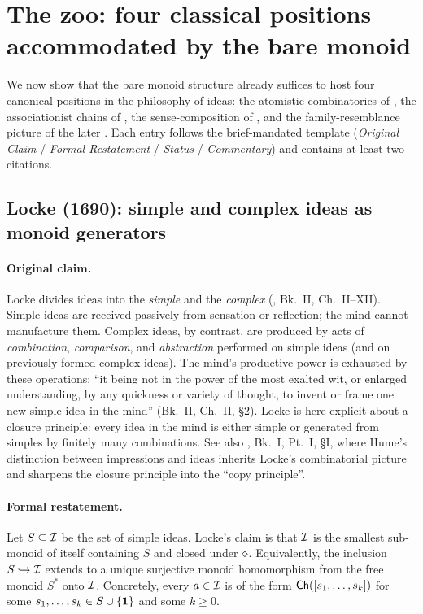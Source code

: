 \section{The zoo: four classical positions accommodated by the bare monoid}\label{sec:zoo}

We now show that the bare monoid structure already suffices to host four
canonical positions in the philosophy of ideas: the atomistic combinatorics
of \cite{Locke1690}, the associationist chains of \cite{Hume1739}, the
sense-composition of \cite{Frege1892}, and the family-resemblance picture
of the later \cite{Wittgenstein1953}.  Each entry follows the
brief-mandated template (\emph{Original Claim} / \emph{Formal Restatement}
/ \emph{Status} / \emph{Commentary}) and contains at least two citations.

\subsection*{Locke (1690): simple and complex ideas as monoid generators}\label{zoo:locke}

\paragraph{Original claim.}
Locke divides ideas into the \emph{simple} and the \emph{complex}
(\cite{Locke1690}, Bk.~II, Ch.~II--XII).  Simple ideas are received
passively from sensation or reflection; the mind cannot manufacture them.
Complex ideas, by contrast, are produced by acts of \emph{combination},
\emph{comparison}, and \emph{abstraction} performed on simple ideas (and
on previously formed complex ideas).  The mind's productive power is
exhausted by these operations: ``it being not in the power of the most
exalted wit, or enlarged understanding, by any quickness or variety of
thought, to invent or frame one new simple idea in the mind'' (Bk.~II,
Ch.~II, \S 2).  Locke is here explicit about a closure principle: every
idea in the mind is either simple or generated from simples by finitely
many combinations.  See also \cite{Hume1739}, Bk.~I, Pt.~I, \S I, where
Hume's distinction between impressions and ideas inherits Locke's
combinatorial picture and sharpens the closure principle into the
``copy principle''.

\paragraph{Formal restatement.}
Let $S \subseteq \mathcal{I}$ be the set of simple ideas.  Locke's claim is
that $\mathcal{I}$ is the smallest sub-monoid of itself containing $S$ and
closed under $\mathbin{\diamond}$.  Equivalently, the inclusion $S \hookrightarrow
\mathcal{I}$ extends to a unique surjective monoid homomorphism from the free
monoid $S^{*}$ onto $\mathcal{I}$.  Concretely, every $a \in \mathcal{I}$ is of the
form $\mathsf{Ch}([s_1, \dots, s_k])$ for some $s_1, \dots, s_k \in S \cup
\{\mathbf{1}\}$ and some $k \ge 0$.

